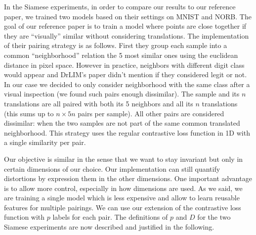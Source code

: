 \documentclass[a4paper,12pt]{report}
\begin{document}
In the Siamese experiments, in order to compare our results to our reference paper, we trained two models based on their settings on MNIST and NORB.
The goal of our reference paper is to train a model where points are close together if they are ``visually'' similar without considering translations.
The implementation of their pairing strategy is as follows.
First they group each sample into a common ``neighborhood'' relation the 5 most similar ones using the euclidean distance in pixel space.
However in practice, neighbors with different digit class would appear and DrLIM's paper didn't mention if they considered legit or not.
In our case we decided to only consider neighborhood with the same class after a visual inspection (we found such pairs enough dissimilar).
The sample and its $n$ translations are all paired with both its 5 neighbors and all its $n$ translations (this sums up to $n \times 5n$ pairs per sample).
All other pairs are considered dissimilar: when the two samples are not part of the same common translated neighborhood.
This strategy uses the regular contrastive loss function in 1D with a single similarity per pair.

Our objective is similar in the sense that we want to stay invariant but only in certain dimensions of our choice.
Our implementation can still quantify distortions by expression them in the other dimensions.
One important advantage is to allow more control, especially in how dimensions are used.
As we said, we are training a single model which is less expensive and allow to learn reusable features for multiple pairings.
We can use our extension of the contrastive loss function with $p$ labels for each pair.
The definitions of $p$ and $D$ for the two Siamese experiments are now described and justified in the following.
\end{document}
